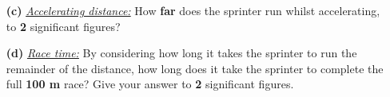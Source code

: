 \documentclass[A4,12pt]{article}
\begin{document}
\begin{enumerate}[label=\bfseries (\arabic*)]
\begin{itemize}
    \item[\bf (c)] \href{https://isaacphysics.org/questions/olympic_sprinter?board=aa9cd909-45d0-45da-921f-d2435c9b3afc}{\it Accelerating distance:} How \textbf{far} does the sprinter run whilst accelerating, to \textbf{2} significant figures?
    \item[\bf (d)] \href{https://isaacphysics.org/questions/olympic_sprinter?board=aa9cd909-45d0-45da-921f-d2435c9b3afc}{\it Race time:} By considering how long it takes the sprinter to run the remainder of the distance, how long does it take the sprinter to complete the full \textbf{100 m} race? Give your answer to \textbf{2} significant figures.

\end{itemize}
\end{enumerate}
\end{document}
